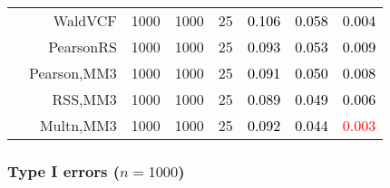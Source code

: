 \documentclass[
]{article}
\begin{document}
\begin{table}[H]
{\begin{tabular}[t]{lrrrrrrr}
\hspace{1em} & WaldVCF & 1000 & 1000 & 25 & \textcolor{black}{0.106} & \textcolor{black}{0.058} & \textcolor{black}{0.004}\\

\hspace{1em} & PearsonRS & 1000 & 1000 & 25 & \textcolor{black}{0.093} & \textcolor{black}{0.053} & \textcolor{black}{0.009}\\

\hspace{1em} & Pearson,MM3 & 1000 & 1000 & 25 & \textcolor{black}{0.091} & \textcolor{black}{0.050} & \textcolor{black}{0.008}\\

\hspace{1em} & RSS,MM3 & 1000 & 1000 & 25 & \textcolor{black}{0.089} & \textcolor{black}{0.049} & \textcolor{black}{0.006}\\

\hspace{1em} & Multn,MM3 & 1000 & 1000 & 25 & \textcolor{black}{0.092} & \textcolor{black}{0.044} & \textcolor{red}{0.003}\\
\bottomrule
\end{tabular}}
\endgroup{}
\end{table}

\hypertarget{type-i-errors-n1000}{%
\subsubsection{\texorpdfstring{Type I errors
(\(n=1000\))}{Type I errors (n=1000)}}\label{type-i-errors-n1000}}
\end{document}
